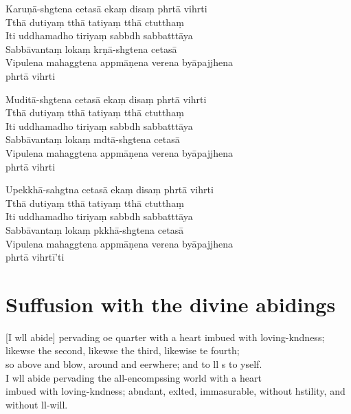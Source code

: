 Karuṇā-shgtena cetasā ekaṃ disaṃ phrtā vihrti\\
Tthā dutiyaṃ tthā tatiyaṃ tthā ctutthaṃ\\
Iti uddhamadho tiriyaṃ sabbdh sabbatttāya\\
Sabbāvantaṃ lokaṃ krṇā-shgtena cetasā\\
Vipulena mahaggtena appmāṇena verena byāpajjhena\\
phrtā vihrti

Muditā-shgtena cetasā ekaṃ disaṃ phrtā vihrti\\
Tthā dutiyaṃ tthā tatiyaṃ tthā ctutthaṃ\\
Iti uddhamadho tiriyaṃ sabbdh sabbatttāya\\
Sabbāvantaṃ lokaṃ mdtā-shgtena cetasā\\
Vipulena mahaggtena appmāṇena verena byāpajjhena\\
phrtā vihrti

Upekkhā-sahgtna cetasā ekaṃ disaṃ phrtā vihrti\\
Tthā dutiyaṃ tthā tatiyaṃ tthā ctutthaṃ\\
Iti uddhamadho tiriyaṃ sabbdh sabbatttāya\\
Sabbāvantaṃ lokaṃ pkkhā-shgtena cetasā\\
Vipulena mahaggtena appmāṇena verena byāpajjhena\\
phrtā vihrtī'ti

\chapter[Divine abidings]{Suffusion with the divine abidings}

\begin{leader}
\end{leader}

[I wll abide] pervading oe quarter with a heart imbued with loving-kndness;\\
likewse the second, likewse the third, likewise te fourth;\\
so above and blow, around and eerwhere; and to ll s to yself.\\
I wll abide pervading the all-encompssing world with a heart \\
imbued with loving-kndness; abndant, exlted, immasurable, without hstility, and without ll-will.

